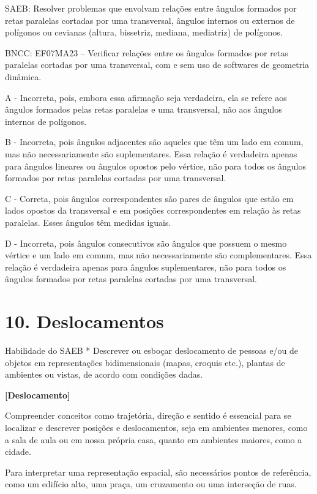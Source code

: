 SAEB: Resolver problemas que envolvam relações entre ângulos formados
por retas paralelas cortadas por uma transversal, ângulos internos ou
externos de polígonos ou cevianas (altura, bissetriz, mediana,
mediatriz) de polígonos.

BNCC: EF07MA23 -- Verificar relações entre os ângulos formados por retas
paralelas cortadas por uma transversal, com e sem uso de softwares de
geometria dinâmica.

A - Incorreta, pois, embora essa afirmação seja verdadeira, ela se
refere aos ângulos formados pelas retas paralelas e uma transversal, não
aos ângulos internos de polígonos.

B - Incorreta, pois ângulos adjacentes são aqueles que têm um lado em
comum, mas não necessariamente são suplementares. Essa relação é
verdadeira apenas para ângulos lineares ou ângulos opostos pelo vértice,
não para todos os ângulos formados por retas paralelas cortadas por uma
transversal.

C - Correta, pois ângulos correspondentes são pares de ângulos que estão
em lados opostos da transversal e em posições correspondentes em relação
às retas paralelas. Esses ângulos têm medidas iguais.

D - Incorreta, pois ângulos consecutivos são ângulos que possuem o mesmo
vértice e um lado em comum, mas não necessariamente são complementares.
Essa relação é verdadeira apenas para ângulos suplementares, não para
todos os ângulos formados por retas paralelas cortadas por uma
transversal.

\hypertarget{deslocamentos}{%
\section{10. Deslocamentos}\label{deslocamentos}}

Habilidade do SAEB * Descrever ou esboçar deslocamento de pessoas e/ou
de objetos em representações bidimensionais (mapas, croquis etc.),
plantas de ambientes ou vistas, de acordo com condições dadas.

\textbf{{[}Deslocamento{]}}

Compreender conceitos como trajetória, direção e sentido é essencial
para se localizar e descrever posições e deslocamentos, seja em
ambientes menores, como a sala de aula ou em nossa própria casa, quanto
em ambientes maiores, como a cidade.

Para interpretar uma representação espacial, são necessários pontos de
referência, como um edifício alto, uma praça, um cruzamento ou uma
interseção de ruas.

